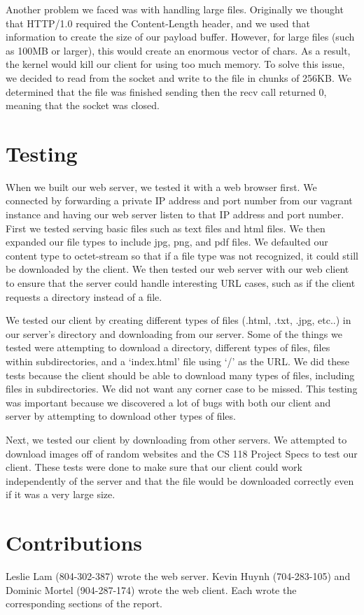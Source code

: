 \documentclass{article}
\begin{document}
    Another problem we faced was with handling large files. Originally we thought
    that HTTP/1.0 required the Content-Length header, and we used that information
    to create the size of our payload buffer. However, for large files (such as 100MB
    or larger), this would create an enormous vector of chars. As a result, the
    kernel would kill our client for using too much memory. To solve this issue,
    we decided to read from the socket and write to the file in chunks of 256KB. We
    determined that the file was finished sending then the recv call returned 0,
    meaning that the socket was closed.

\section{Testing}
    When we built our web server, we tested it with a web browser first. We
    connected by forwarding a private IP address and port number from our
    vagrant instance and having our web server listen to that IP address and
    port number. First we tested serving basic files such as text files and
    html files. We then expanded our file types to include jpg, png, and pdf
    files. We defaulted our content type to octet-stream so that if a file type
    was not recognized, it could still be downloaded by the client. We then
    tested our web server with our web client to ensure that the server could
    handle interesting URL cases, such as if the client requests a directory
    instead of a file.
    
    We tested our client by creating different types of files (.html, .txt,
    .jpg, etc..)  in our server's directory and downloading from our server.
    Some of the things we tested were attempting to download a directory,
    different types of files, files within subdirectories, and a `index.html'
    file using `/' as the URL. We did these tests because the client should be
    able to download many types of files, including files in subdirectories. We
    did not want any corner case to be missed. This testing was important
    because we discovered a lot of bugs with both our client and server by
    attempting to download other types of files.

    Next, we tested our client by downloading from other servers. We attempted
    to download images off of random websites and the CS 118 Project Specs to
    test our client. These tests were done to make sure that our client could
    work independently of the server and that the file would be downloaded
    correctly even if it was a very large size.

\section{Contributions}
    Leslie Lam (804-302-387) wrote the web server. Kevin Huynh (704-283-105)
    and Dominic Mortel (904-287-174) wrote the web client. Each wrote the
    corresponding sections of the report.
\end{document}
